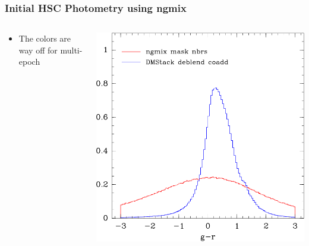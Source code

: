 \documentclass{beamer}
\begin{document}
\frame
{
    \frametitle{Initial HSC Photometry using ngmix}

 
    \begin{columns}
        \begin{column}{0.5\textwidth}
            \begin{itemize}

                \item The colors are way off for multi-epoch

            \end{itemize}
        \end{column}
        \begin{column}{0.5\textwidth}
            \includegraphics[width=\textwidth]{compare-me-dmstack-gmr.png}
        \end{column}
    \end{columns}
}
\end{document}

